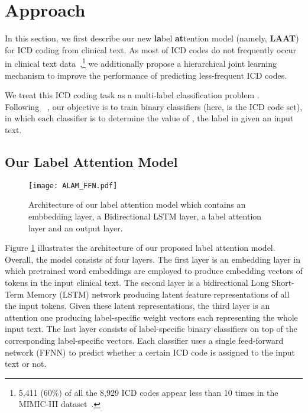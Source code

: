 \documentclass{article}
\begin{document}
\section{Approach}

In this section, we first describe our new \textbf{la}bel \textbf{at}tention model (namely, \textbf{LAAT}) for ICD coding from clinical text. As most of ICD codes do not frequently occur in clinical text data~\cite{koopman2015automatic,xie2019ehr},\footnote{5,411 (60\%) of all the 8,929 ICD codes appear less than 10 times in the MIMIC-III dataset~\cite{johnson2016mimic}.}  we additionally propose a hierarchical joint learning mechanism to improve the performance of predicting less-frequent ICD codes.


We treat this ICD coding task as a multi-label classification problem \cite{mccallum1999multi}. Following~\citeauthor{mullenbach2018}~,  our objective is to train  binary classifiers (here,  is the ICD code set), in which each classifier is to determine the value of , the  label in  given an input text.


\subsection{Our Label Attention Model}\label{ssec:labelatten} 

\begin{figure}
    \centering
    \texttt{[image: ALAM\_FFN.pdf]}
    \caption{Architecture of our label attention model  which contains an embbedding layer, a Bidirectional LSTM layer, a label attention layer and an output layer.}\label{fig:ALAM}
\end{figure}

Figure \ref{fig:ALAM} illustrates the architecture of our proposed label attention model. Overall, the model consists of four layers. The first layer is an embedding layer in which pretrained word embeddings are employed to produce embedding vectors of tokens in the input clinical text. The second layer is a bidirectional Long Short-Term Memory (LSTM) network producing latent feature representations of all the input tokens. 
 Given these latent representations, the third layer is an attention one producing label-specific weight vectors each representing the whole input text.  The last layer consists of label-specific binary classifiers on top of the corresponding label-specific vectors. Each classifier uses a single feed-forward network (FFNN) to predict whether a certain ICD code is assigned to the input text or not. 
\end{document}
